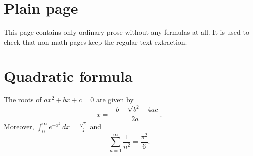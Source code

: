 \documentclass{article}
\begin{document}
\section*{Plain page}
This page contains only ordinary prose without any formulas at all.
It is used to check that non-math pages keep the regular text extraction.
\newpage
\section*{Quadratic formula}
The roots of $ax^2+bx+c=0$ are given by
\[ x = \frac{-b \pm \sqrt{b^2-4ac}}{2a}. \]
Moreover, $\int_0^\infty e^{-x^2}\,dx = \frac{\sqrt{\pi}}{2}$ and
\[ \sum_{n=1}^{\infty} \frac{1}{n^2} = \frac{\pi^2}{6}. \]
\end{document}
